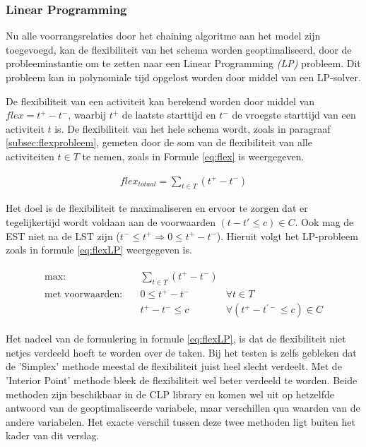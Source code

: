 \subsubsection{Linear Programming}
\label{subsubsec:flexoplossing}
Nu alle voorrangsrelaties door het chaining algoritme aan het model zijn toegevoegd, kan de flexibiliteit van het schema worden geoptimaliseerd, door de probleeminstantie om te zetten naar een Linear Programming \emph{(LP)} probleem. Dit probleem kan in polynomiale tijd opgelost worden door middel van een LP-solver.

De flexibiliteit van een activiteit kan berekend worden door middel van $flex = t^+ - t^-$, waarbij $t^+$ de laatste starttijd en $t^-$ de vroegste starttijd van een activiteit $t$ is. De flexibiliteit van het hele schema wordt, zoals in paragraaf \ref{subsec:flexprobleem}, gemeten door de som van de flexibiliteit van alle activiteiten $t \in T$ te nemen, zoals in Formule \ref{eq:flex} is weergegeven.

\begin{align}
\label{eq:flex}
    flex_{totaal} = \sum_{t \in T} (t^+ - t^-)
\end{align}

Het doel is de flexibiliteit te maximaliseren en ervoor te zorgen dat er tegelijkertijd wordt voldaan aan de voorwaarden $(t - t' \leq c) \in C$. Ook mag de EST niet na de LST zijn ($t^- \leq t^+ \Rightarrow 0 \leq t^+ - t^-$). Hieruit volgt het LP-probleem zoals in formule \ref{eq:flexLP} weergegeven is.

\begin{align}
\label{eq:flexLP}
\begin{aligned}
        \text{max:}& \quad \sum_{t \in T} (t^+ - t^-) & \\
 \text{met voorwaarden:}& \quad 0 \leq t^+ - t^- & \forall t \in T \\
                   & \quad t^+ - t^- \leq c & \forall (t^+ - t^{'-} \leq c) \in C
\end{aligned}
\end{align}

Het nadeel van de formulering in formule \ref{eq:flexLP}, is dat de flexibiliteit niet netjes verdeeld hoeft te worden over de taken. Bij het testen is zelfs gebleken dat de 'Simplex' methode meestal de flexibiliteit juist heel slecht verdeelt. Met de 'Interior Point' methode bleek de flexibiliteit wel beter verdeeld te worden. Beide methoden zijn beschikbaar in de CLP library en komen wel uit op hetzelfde antwoord van de geoptimaliseerde variabele, maar verschillen qua waarden van de andere variabelen. Het exacte verschil tussen deze twee methoden ligt buiten het kader van dit verslag.


